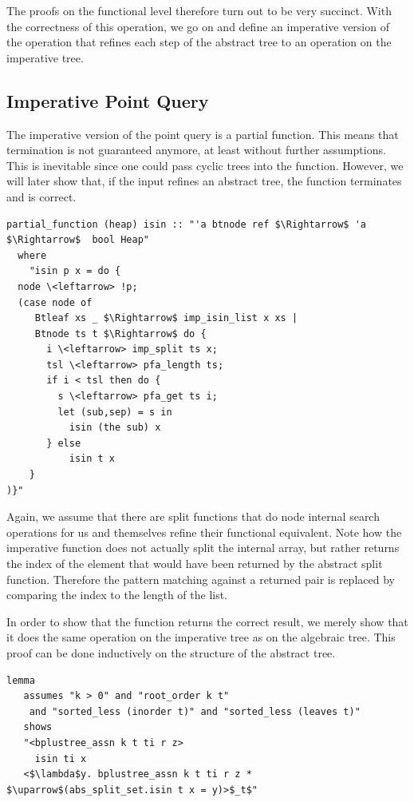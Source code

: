 \documentclass[a4paper,UKenglish,cleveref, autoref, thm-restate]{lipics-v2021}
\begin{document}
The proofs on the functional level therefore turn out to be very succinct.
With the correctness of this operation,
we go on and define an imperative version of the operation that
refines each step of the abstract tree to an operation on the imperative tree.

\subsection{Imperative Point Query}
\label{sec:imperative_pq}

The imperative version of the point query is a partial function.
This means that termination is not guaranteed anymore,
at least without further assumptions.
This is inevitable since one could pass cyclic trees into the function.
However, we will later show that, if the input refines an abstract tree,
the function terminates and is correct.

\begin{lstlisting}[mathescape=true, language=Isabelle,label=lst:isin-imp-def]
partial_function (heap) isin :: "'a btnode ref $\Rightarrow$ 'a $\Rightarrow$  bool Heap"
  where
    "isin p x = do {
  node \<leftarrow> !p;
  (case node of
     Btleaf xs _ $\Rightarrow$ imp_isin_list x xs |
     Btnode ts t $\Rightarrow$ do {
       i \<leftarrow> imp_split ts x;
       tsl \<leftarrow> pfa_length ts;
       if i < tsl then do {
         s \<leftarrow> pfa_get ts i;
         let (sub,sep) = s in
           isin (the sub) x
       } else
           isin t x
    }
)}"
\end{lstlisting}

Again, we assume that there are split functions that do node internal search operations for us
and themselves refine their functional equivalent.
Note how the imperative function does not actually split
the internal array, but rather returns the index of the element
that would have been returned by the abstract split function.
Therefore the pattern matching against a returned pair
is replaced by comparing the index to the length of the list.

In order to show that the function returns the correct result,
we merely show that it does the same operation on the imperative tree
as on the algebraic tree.
This proof can be done inductively on the structure of the abstract tree.

\begin{lstlisting}[mathescape=true, language=Isabelle,label=lst:isin-refines]
lemma  
   assumes "k > 0" and "root_order k t"
    and "sorted_less (inorder t)" and "sorted_less (leaves t)"
   shows
   "<bplustree_assn k t ti r z>
     isin ti x
   <$\lambda$y. bplustree_assn k t ti r z * $\uparrow$(abs_split_set.isin t x = y)>$_t$"
\end{lstlisting}
\end{document}
